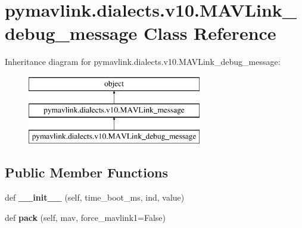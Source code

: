 \hypertarget{classpymavlink_1_1dialects_1_1v10_1_1MAVLink__debug__message}{}\section{pymavlink.\+dialects.\+v10.\+M\+A\+V\+Link\+\_\+debug\+\_\+message Class Reference}
\label{classpymavlink_1_1dialects_1_1v10_1_1MAVLink__debug__message}
Inheritance diagram for pymavlink.\+dialects.\+v10.\+M\+A\+V\+Link\+\_\+debug\+\_\+message\+:\begin{figure}[H]
\begin{center}
\leavevmode
\includegraphics[height=3.000000cm]{classpymavlink_1_1dialects_1_1v10_1_1MAVLink__debug__message}
\end{center}
\end{figure}
\subsection*{Public Member Functions}
\begin{DoxyCompactItemize}
\item 
\mbox{\label{classpymavlink_1_1dialects_1_1v10_1_1MAVLink__debug__message_a00a918d4501d73b3dde4868ede96ea1b}} 
def {\bfseries \+\_\+\+\_\+init\+\_\+\+\_\+} (self, time\+\_\+boot\+\_\+ms, ind, value)
\item 
\mbox{\label{classpymavlink_1_1dialects_1_1v10_1_1MAVLink__debug__message_ad73a5c9536599e4d81f7f2e932cb90ff}} 
def {\bfseries pack} (self, mav, force\+\_\+mavlink1=False)
\end{DoxyCompactItemize}

